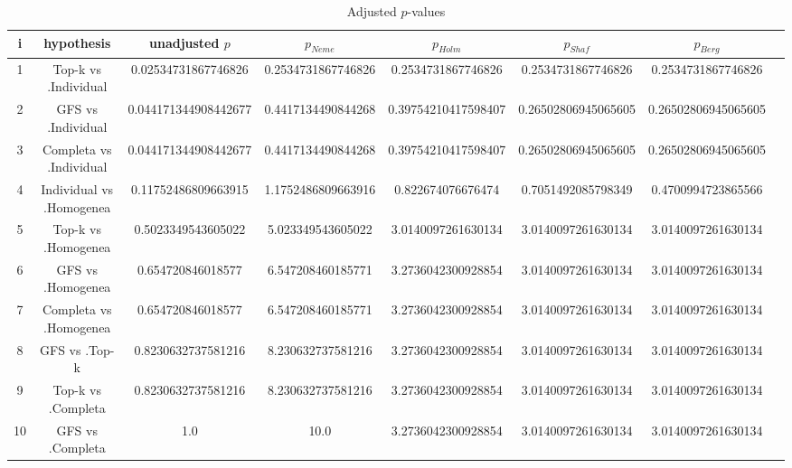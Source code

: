 \documentclass[a4paper,10pt]{article}
\begin{document}
\begin{landscape}
\begin{table}[!htp]
\centering\tiny
\caption{Adjusted $p$-values}
\begin{tabular}{cccccccc}
i&hypothesis&unadjusted $p$&$p_{Neme}$&$p_{Holm}$&$p_{Shaf}$&$p_{Berg}$\\
\hline
1&Top-k vs .Individual&0.02534731867746826&0.2534731867746826&0.2534731867746826&0.2534731867746826&0.2534731867746826\\
2&GFS vs .Individual&0.044171344908442677&0.4417134490844268&0.39754210417598407&0.26502806945065605&0.26502806945065605\\
3&Completa vs .Individual&0.044171344908442677&0.4417134490844268&0.39754210417598407&0.26502806945065605&0.26502806945065605\\
4&Individual vs .Homogenea&0.11752486809663915&1.1752486809663916&0.822674076676474&0.7051492085798349&0.4700994723865566\\
5&Top-k vs .Homogenea&0.5023349543605022&5.023349543605022&3.0140097261630134&3.0140097261630134&3.0140097261630134\\
6&GFS vs .Homogenea&0.654720846018577&6.547208460185771&3.2736042300928854&3.0140097261630134&3.0140097261630134\\
7&Completa vs .Homogenea&0.654720846018577&6.547208460185771&3.2736042300928854&3.0140097261630134&3.0140097261630134\\
8&GFS vs .Top-k&0.8230632737581216&8.230632737581216&3.2736042300928854&3.0140097261630134&3.0140097261630134\\
9&Top-k vs .Completa&0.8230632737581216&8.230632737581216&3.2736042300928854&3.0140097261630134&3.0140097261630134\\
10&GFS vs .Completa&1.0&10.0&3.2736042300928854&3.0140097261630134&3.0140097261630134\\
\hline
\end{tabular}
\end{table}

\end{landscape}
\end{document}
